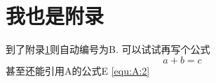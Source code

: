 \section{我也是附录}
\label{sec:B}
到了附录\ref{sec:B}则自动编号为B. 可以试试再写个公式
\begin{equation}
a+b=c
\end{equation}
甚至还能引用A的公式E \ref{equ:A:2}

\pagebreak[4]
